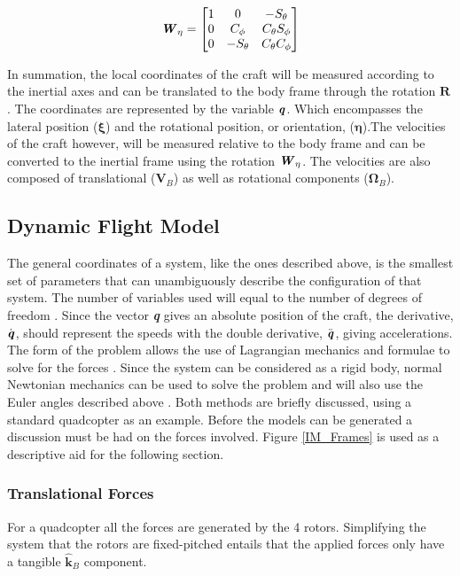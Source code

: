 \begin{equation}
{\textbf{\textit{W}}_\eta} = 
\begin{bmatrix}
1 & 0 & -S_\theta\\
0 & C_\phi & C_\theta S_\phi\\
0 & -S_\theta & C_\theta C_\phi
\end{bmatrix}
\label{EQ_VelocityRotation}
\end{equation}

In summation, the local coordinates of the craft will be measured according to the inertial axes and can be translated to the body frame through the rotation $\textbf{R}$. The coordinates are represented by the variable $\textbf{\textit{q}}$. Which encompasses the lateral position ($\boldsymbol{\xi}$) and the rotational position, or orientation, ($\boldsymbol{\eta}$).The velocities of the craft however, will be measured relative to the body frame and can be converted to the inertial frame using the rotation $\textbf{\textit{W}}_\eta$. The velocities are also composed of translational ($\textbf{V}_B$) as well as rotational components ($\boldsymbol{\Omega}_B$).

\subsection{Dynamic Flight Model}

The general coordinates of a system, like the ones described above, is the smallest set of parameters that can unambiguously describe the configuration of that system. The number of variables used will equal to the number of degrees of freedom \cite{MIT}. 
Since the vector \textbf{\textit{q}} gives an absolute position of the craft, the derivative, $\dot{\textbf{\textit{q}}}$, should represent the speeds with the double derivative, $\ddot{\textbf{\textit{q}}}$, giving accelerations. The form of the problem allows the use of Lagrangian mechanics and formulae to solve for the forces \cite{MIT, MiniFlying}. Since the system can be considered as  a rigid body, normal Newtonian mechanics can be used to solve the problem and will also use the Euler angles described above \cite{Luukkonen, Modelling}. Both methods are briefly discussed, using a standard quadcopter as an example. Before the models can be generated a discussion must be had on the forces involved.  Figure \ref{IM_Frames} is used as a descriptive aid for the following section.


\subsubsection{Translational Forces}
For a quadcopter all the forces are generated by the 4 rotors. Simplifying the system that the rotors are fixed-pitched entails that the applied forces only have a tangible $\hat{\textbf{k}}_B$ component.

